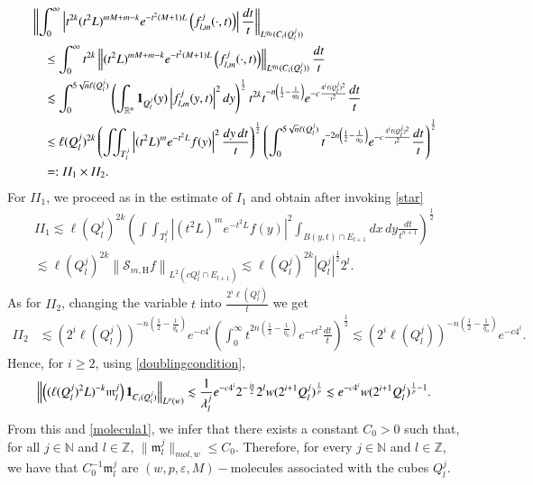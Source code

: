 \documentclass[11pt, a4paper,leqno]{amsart}
\newcommand{\mm}{\mathfrak{m}}
\renewcommand{\chi}{{\bf 1}}
\theoremstyle{plain}
\theoremstyle{definition}
\theoremstyle{remark}
\numberwithin{equation}{section}
\def \N{ \mathbb{N} }
\def \Z{ \mathbb{Z} }
\def \Scal{ \mathcal{S} }
\def \hh{ \mathrm{H} }
\def \mol{ (w,p,\varepsilon,M)-\textrm{molecule}}
\def \iint{\int\!\!\!\int}
\begin{document}
\begin{align*}
&\left\|\int_{0}^{\infty}\left|t^{2k}(t^2L)^{mM+m-k}e^{-t^2(M+1)L}
\left({f}_{l,m}^j(\cdot,t)\right)\right|
\frac{dt}{t}\right\|_{L^{q_0}(C_i(Q_l^j))}
\\
&\quad \leq\int_{0}^{\infty}t^{2k}\left\|
(t^2L)^{mM+m-k}e^{-t^2(M+1)L}
\left({f}_{l,m}^j(\cdot,t)\right)\right\|_{L^{q_0}(C_i(Q_l^j))}
\frac{dt}{t}
\\
&\quad \lesssim \int_{0}^{5\sqrt{n}\ell(Q_l^j)}\left(\int_{\mathbb{R}^n}
\chi_{Q_l^j}(y)\left| {f}_{l,m}^j(y,t)\right|^{2}dy
\right)^{\frac{1}{2}}t^{2k}t^{-n\left(\frac{1}{2}-\frac{1}{q_0}\right)}e^{-c\frac{4^i\ell(Q_l^j)^2}{t^2}}
\frac{dt}{t}
\\
&\quad \lesssim \ell(Q_l^j)^{2k}\left( \iint_{T_l^j}
\left|
(t^2L)^me^{-t^2L}f(y)\right|^{2}\frac{dy\,dt}{t} \right)^{\frac{1}{2}} \left(\int_{0}^{5\sqrt{n}\ell(Q_l^j)}t^{-2n\left(\frac{1}{2}-\frac{1}{q_0}\right)}
e^{-c\frac{4^i\ell(Q_l^j)^2}{t^2}}
\frac{dt}{t}\right)^{\frac{1}{2}}
\\
&\quad =:II_1\times II_2.
\end{align*}
For $II_1$, we proceed as in the estimate of $I_1$ and obtain after invoking \eqref{star} 
\begin{multline*}
II_1\lesssim
\ell(Q_l^j)^{2k}\left(\iint_{T_l^j}
\left|
(t^2L)^me^{-t^2L}f(y)\right|^{2}\int_{B(y,t)\cap E_{l+1}}dx \, dy \frac{dt}{t^{n+1}}\right)^{\frac{1}{2}}
\\
\lesssim \ell(Q_l^j)^{2k}\left\|\Scal_{m,\hh}f\right\|_{L^2(cQ_l^j\cap
E_{l+1})}
\lesssim \ell(Q_l^j)^{2k}|Q_l^j|^{\frac{1}{2}}2^l.
\end{multline*}
As for $II_2$, changing the variable $t$ into $\frac{2^i\ell(Q_l^j)}{t}$ we get
\begin{align*}
II_2
&\lesssim (2^i\ell(Q_l^j))^{-n\left(\frac{1}{2}-\frac{1}{q_0}\right)}e^{-c4^i}\left(\int_{0}^{\infty}t^{2n\left(\frac{1}{2}-\frac{1}{q_0}\right)}
e^{-ct^2}
\frac{dt}{t}\right)^{\frac{1}{2}}\lesssim (2^i\ell(Q_l^j))^{-n\left(\frac{1}{2}-\frac{1}{q_0}\right)}e^{-c4^i}.
\end{align*}
Hence, for $i\geq 2$, using \eqref{doublingcondition},
\begin{align*}
\left\|\left((\ell(Q_l^j)^2L)^{-k}\mm_{l}^{j}\right)\chi_{C_i(Q_l^j)}\right\|_{L^p(w)}
 \lesssim \frac{1}{\lambda_l^j}e^{-c4^i}2^{-\frac{in}{2}}2^lw(2^{i+1}Q_l^j)^{\frac{1}{p}}
\lesssim
e^{-c4^i}w(2^{i+1}Q_l^j)^{\frac{1}{p}-1}.
\end{align*}
From this and \eqref{molecula1}, we infer that there exists a constant $C_0>0$ such that, for all $j\in \N$ and $l\in \Z$,
$
\|\mm_{l}^{j}\|_{mol,w}\leq C_0.
$
Therefore, for every $j\in \N$ and $l\in \Z$, we have that $C_0^{-1}\mm_{l}^{j}$ are $\mol$s associated with the cubes 
$Q_l^j$.
\end{document}
